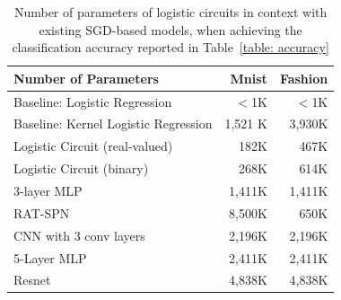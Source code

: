 \documentclass[letterpaper]{article} %
\begin{document}
          \begin{table}[tb]
 \centering
  \begin{minipage}{0.48\textwidth}
     {\footnotesize
          \caption{Number of parameters of logistic circuits in context with existing SGD-based models, when achieving the classification accuracy reported in Table~\ref{table: accuracy}
          }
          \label{table: size}
          \centering
          {\fontsize{8.3}{9}\selectfont
          \begin{sc}
          \begin{tabular}{ @{}l r r @{} }
          \toprule
       	 Number of Parameters & Mnist & Fashion \\
          \midrule\midrule
           Baseline: Logistic Regression & $<$1K & $<$1K \\
           Baseline: Kernel Logistic Regression & 1,521 K & 3,930K\\
                       \midrule 
          Logistic Circuit (real-valued) & 182K & 467K\\
          Logistic Circuit (binary) & 268K & 614K \\
          \midrule
            3-layer MLP  & 1,411K  & 1,411K \\
 	RAT-SPN~ \cite{rat-spn2018} 	 & 8,500K & 650K \\
	CNN with 3 conv layers  & 2,196K & 2,196K\\
	            5-Layer MLP & 2,411K &  2,411K \\
                        Resnet \cite{he2016cvpr} & 4,838K & 4,838K \\
		\bottomrule
		\end{tabular}
          \end{sc}
     }}
    \end{minipage}
   \end{table}
     
\end{document}
